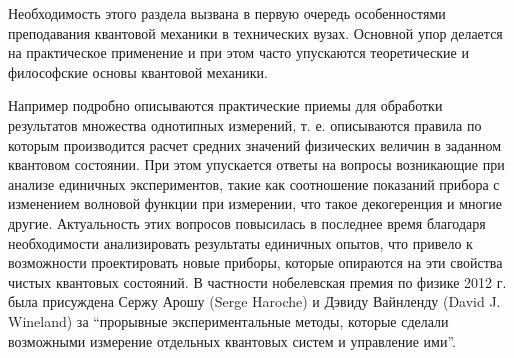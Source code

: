 Необходимость этого раздела вызвана в первую очередь особенностями
преподавания квантовой механики в технических вузах. Основной упор
делается на практическое применение и при этом часто упускаются
теоретические и философские основы квантовой механики.

Например подробно описываются практические приемы для обработки
результатов множества однотипных измерений, т. е. описываются правила
по которым производится расчет средних значений физических величин в
заданном квантовом состоянии. При этом упускается ответы на вопросы
возникающие при анализе единичных экспериментов, такие как соотношение
показаний прибора с изменением волновой функции при измерении, что
такое декогеренция 
и многие другие. Актуальность этих вопросов
повысилась в последнее время благодаря необходимости анализировать
результаты единичных опытов, что привело к возможности
проектировать новые приборы, которые опираются на эти свойства чистых
квантовых состояний. В частности нобелевская премия по физике 2012
г. была присуждена  Сержу Арошу (Serge Haroche) и
Дэвиду Вайнленду (David J. Wineland) за ``прорывные
экспериментальные методы, которые сделали возможными измерение
отдельных квантовых систем и управление ими''. 
